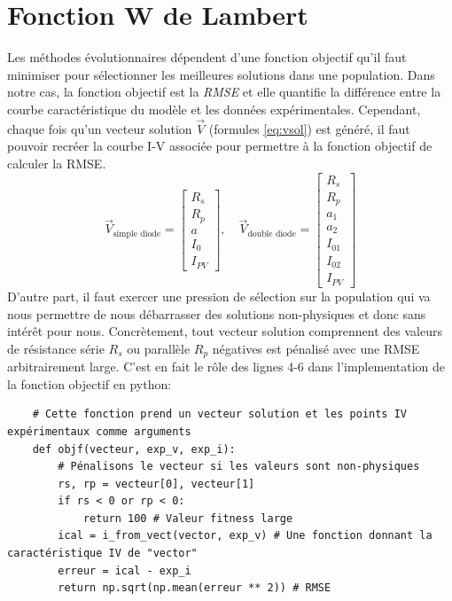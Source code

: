 \section{Fonction W de Lambert}
Les méthodes évolutionnaires dépendent d'une fonction objectif qu'il faut minimiser pour sélectionner les meilleures solutions dans une population. Dans notre cas, la fonction objectif est la \textit{RMSE}  et elle quantifie la différence entre la courbe caractéristique du modèle et les données expérimentales. Cependant, chaque fois qu'un vecteur solution $\vec{V}$ (formules \ref{eq:vsol}) est généré, il faut pouvoir recréer la courbe I-V associée pour permettre à la fonction objectif de calculer la RMSE.
\begin{equation}
  \label{eq:vsol}
  \vec{V}_{\text{simple diode}} = 
  \begin{bmatrix}
    R_s\\
    R_{p}\\
    a\\
    I_0\\
    I_{PV}
  \end{bmatrix},
  \quad
  \vec{V}_{\text{double diode}} = 
  \begin{bmatrix}
    R_s\\
    R_{p}\\
    a_1\\
    a_2\\
    I_{01}\\
    I_{02}\\
    I_{PV}
  \end{bmatrix}
\end{equation}
D'autre part, il faut exercer une pression de sélection sur la population qui va nous permettre de nous débarrasser des solutions non-physiques et donc sans intérêt pour nous. Concrètement, tout vecteur solution comprennent des valeurs de résistance série $R_s$ ou parallèle $R_p$ négatives est pénalisé avec une RMSE arbitrairement large. C'est en fait le rôle des lignes 4-6 dans l'implementation de la fonction objectif en python:\\

\noindent
\begin{minipage}{\linewidth}
\begin{verbatim}
    # Cette fonction prend un vecteur solution et les points IV expérimentaux comme arguments
    def objf(vecteur, exp_v, exp_i):
        # Pénalisons le vecteur si les valeurs sont non-physiques
        rs, rp = vecteur[0], vecteur[1]
        if rs < 0 or rp < 0:
            return 100 # Valeur fitness large
        ical = i_from_vect(vector, exp_v) # Une fonction donnant la caractéristique IV de "vector"
        erreur = ical - exp_i
        return np.sqrt(np.mean(erreur ** 2)) # RMSE         
\end{verbatim}
\end{minipage}
\vspace*{12pt}


